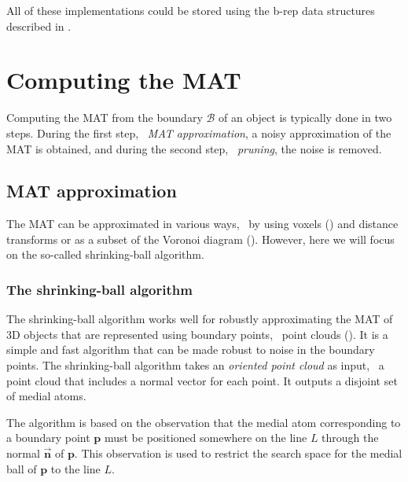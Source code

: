 All of these implementations could be stored using the b-rep data structures described in .

\section{Computing the MAT} 
Computing the MAT from the boundary $\mathcal{B}$ of an object is typically done in two steps. 
During the first step, \ie\ \emph{MAT approximation}, a noisy approximation of the MAT is obtained, and during the second step, \ie\ \emph{pruning}, the noise is removed.

\subsection{MAT approximation}\label{sec:mat-approximation}
The MAT can be approximated in various ways, \eg\ by using voxels () and distance transforms or as a subset of the Voronoi diagram ().
However, here we will focus on the so-called shrinking-ball algorithm.

\subsubsection{The shrinking-ball algorithm}
The shrinking-ball algorithm works well for robustly approximating the MAT of 3D objects that are represented using boundary points, \ie\ point clouds ().
It is a simple and fast algorithm that can be made robust to noise in the boundary points.
The shrinking-ball algorithm takes an \emph{oriented point cloud} as input, \ie\ a point cloud that includes a normal vector for each point. 
It outputs a disjoint set of medial atoms. 

The algorithm is based on the observation that the medial atom corresponding to a boundary point $\mathbf{p}$ must be positioned somewhere on the line $L$ through the normal $\vec{\mathbf{n}}$ of $\mathbf{p}$.
This observation is used to restrict the search space for the medial ball of $\mathbf{p}$ to the line $L$.

